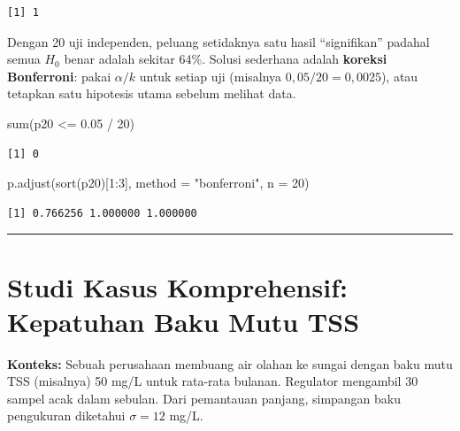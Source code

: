 \documentclass[
  indonesian,
  letterpaper,
]{book}
\newenvironment{Shaded}{\begin{snugshade}}{\end{snugshade}}
\newcommand{\AttributeTok}[1]{\textcolor[rgb]{0.40,0.45,0.13}{#1}}
\newcommand{\DecValTok}[1]{\textcolor[rgb]{0.68,0.00,0.00}{#1}}
\newcommand{\FloatTok}[1]{\textcolor[rgb]{0.68,0.00,0.00}{#1}}
\newcommand{\FunctionTok}[1]{\textcolor[rgb]{0.28,0.35,0.67}{#1}}
\newcommand{\NormalTok}[1]{\textcolor[rgb]{0.00,0.23,0.31}{#1}}
\newcommand{\SpecialCharTok}[1]{\textcolor[rgb]{0.37,0.37,0.37}{#1}}
\newcommand{\StringTok}[1]{\textcolor[rgb]{0.13,0.47,0.30}{#1}}
\begin{document}
\begin{verbatim}
[1] 1
\end{verbatim}

Dengan 20 uji independen, peluang setidaknya satu hasil ``signifikan''
padahal semua \(H_0\) benar adalah sekitar 64\%. Solusi sederhana adalah
\textbf{koreksi Bonferroni}: pakai \(\alpha/k\) untuk setiap uji
(misalnya \(0{,}05/20 = 0{,}0025\)), atau tetapkan satu hipotesis utama
sebelum melihat data.

\begin{Shaded}
\begin{Highlighting}[]
\FunctionTok{sum}\NormalTok{(p20 }\SpecialCharTok{\textless{}=} \FloatTok{0.05} \SpecialCharTok{/} \DecValTok{20}\NormalTok{)}
\end{Highlighting}
\end{Shaded}

\begin{verbatim}
[1] 0
\end{verbatim}

\begin{Shaded}
\begin{Highlighting}[]
\FunctionTok{p.adjust}\NormalTok{(}\FunctionTok{sort}\NormalTok{(p20)[}\DecValTok{1}\SpecialCharTok{:}\DecValTok{3}\NormalTok{], }\AttributeTok{method =} \StringTok{"bonferroni"}\NormalTok{, }\AttributeTok{n =} \DecValTok{20}\NormalTok{)}
\end{Highlighting}
\end{Shaded}

\begin{verbatim}
[1] 0.766256 1.000000 1.000000
\end{verbatim}

\begin{center}\rule{0.5\linewidth}{0.5pt}\end{center}


\chapter{Studi Kasus Komprehensif: Kepatuhan Baku Mutu
TSS}\label{studi-kasus-komprehensif-kepatuhan-baku-mutu-tss}

\textbf{Konteks:} Sebuah perusahaan membuang air olahan ke sungai dengan
baku mutu TSS (misalnya) 50 mg/L untuk rata-rata bulanan. Regulator
mengambil 30 sampel acak dalam sebulan. Dari pemantauan panjang,
simpangan baku pengukuran diketahui \(\sigma = 12\) mg/L.
\end{document}
